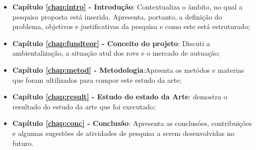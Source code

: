\begin{itemize}

  \item \textbf{Capítulo \ref{chap:intro} - Introdução}: Contextualiza o âmbito, no qual a pesquisa proposta está inserida. Apresenta, portanto, a definição do problema, objetivos e justificativas da pesquisa e como este \thetypeworkthree está estruturado;
  \item \textbf{Capítulo \ref{chap:fundteor} - Conceito do projeto}: Discuti a ambientalização, a situação atul dos rovs e o mercado de autuação;
  \item \textbf{Capítulo \ref{chap:metod} - Metodologia}:Aprsenta os metódos e materias que foram ultilizados para compor este estudo da arte;
  \item \textbf{Capítulo \ref{chap:result} - Estudo do estado da Arte}: demostra o resultado do estudo da arte que foi executado;
  \item \textbf{Capítulo \ref{chap:conc} - Conclusão}: Apresenta as conclusóes, contribuições e algumas sugestões de atividades de pesquisa a serem desenvolvidas no futuro.

\end{itemize}
